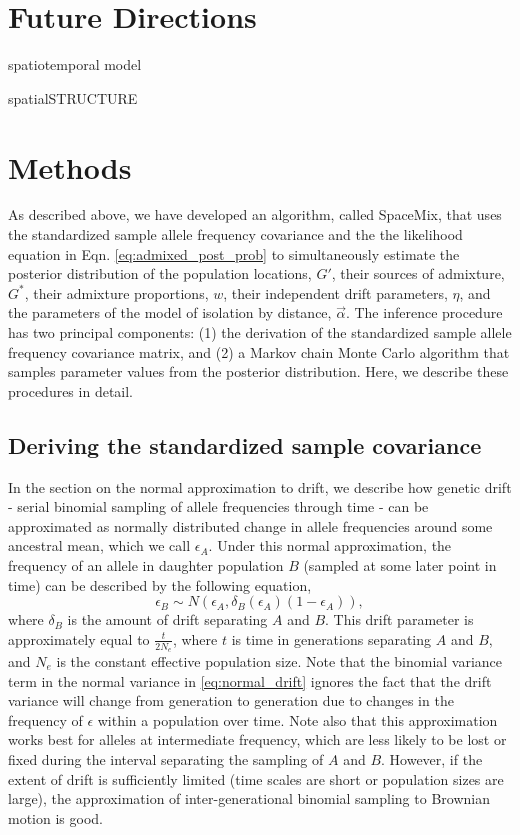 \documentclass[12pt]{article}
\newcommand{\identifyadmixsource}[1]{{#1^{*}}}
\begin{document}
\section*{Future Directions}

spatiotemporal model

spatialSTRUCTURE

\section*{Methods}
As described above, we have developed an algorithm, called SpaceMix, that uses the standardized sample allele frequency covariance and the the likelihood equation in Eqn. \eqref{eq:admixed_post_prob} to simultaneously estimate the posterior distribution of the population locations, $G'$, their sources of admixture, $\identifyadmixsource{G}$, their admixture proportions, $w$, their independent drift parameters, $\eta$, and the parameters of the model of isolation by distance, $\vec{\alpha}$.  The inference procedure has two principal components: (1) the derivation of the standardized sample allele frequency covariance matrix, and (2) a Markov chain Monte Carlo algorithm that samples parameter values from the posterior distribution.  Here, we describe these procedures in detail.

\subsection*{Deriving the standardized sample covariance}
In the section on the normal approximation to drift, we describe how genetic drift - serial binomial sampling of allele frequencies through time - can be approximated as normally distributed change in allele frequencies around some ancestral mean, which we call $\epsilon_A$.  Under this normal approximation, the frequency of an allele in daughter population $B$ (sampled at some later point in time) can be described by the following equation,
%
\begin{equation}
\label{eq:normal_drift}
\epsilon_B \sim N(\epsilon_A,\delta_B(\epsilon_A)(1-\epsilon_A)),
\end{equation}
%
where $\delta_B$ is the amount of drift separating $A$ and $B$.  This drift parameter is approximately equal to $\frac{t}{2N_e}$, where $t$ is time in generations separating $A$ and $B$, and $N_e$ is the constant effective population size.  Note that the binomial variance term in the normal variance in \eqref{eq:normal_drift} ignores the fact that the drift variance will change from generation to generation due to changes in the frequency of $\epsilon$ within a population over time.  Note also that this approximation works best for alleles at intermediate frequency, which are less likely to be lost or fixed during the interval separating the sampling of $A$ and $B$.  However, if the extent of drift is sufficiently limited (time scales are short or population sizes are large), the approximation of inter-generational binomial sampling to Brownian motion is good.  
\end{document}
